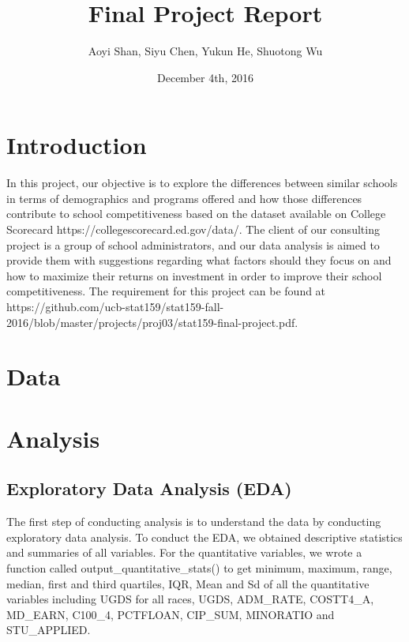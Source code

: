 \documentclass{article}
\title{Final Project Report}
\author{Aoyi Shan, Siyu Chen, Yukun He, Shuotong Wu}
\date{December 4th, 2016}
\begin{document}


\maketitle

\section{Introduction}

In this project, our objective is to explore the differences between similar schools in terms of demographics and programs offered and how those differences contribute to school competitiveness based on the dataset available on College Scorecard https://collegescorecard.ed.gov/data/. The client of our consulting project is a group of school administrators, and our data analysis is aimed to provide them with suggestions regarding what factors should they focus on and how to maximize their returns on investment in order to improve their school competitiveness. The requirement for this project can be found at https://github.com/ucb-stat159/stat159-fall-2016/blob/master/projects/proj03/stat159-final-project.pdf.

\section{Data}





\section{Analysis}

\subsection{Exploratory Data Analysis (EDA)}

The first step of conducting analysis is to understand the data by conducting exploratory data analysis. To conduct the EDA, we obtained descriptive statistics and summaries of all variables. For the quantitative variables, we wrote a function called output\_quantitative\_stats() to get minimum, maximum, range, median, first and third quartiles, IQR, Mean and Sd of all the quantitative variables including UGDS for all races, UGDS, ADM\_RATE, COSTT4\_A, MD\_EARN, C100\_4, PCTFLOAN, CIP\_SUM, MINORATIO and STU\_APPLIED.
\end{document}
